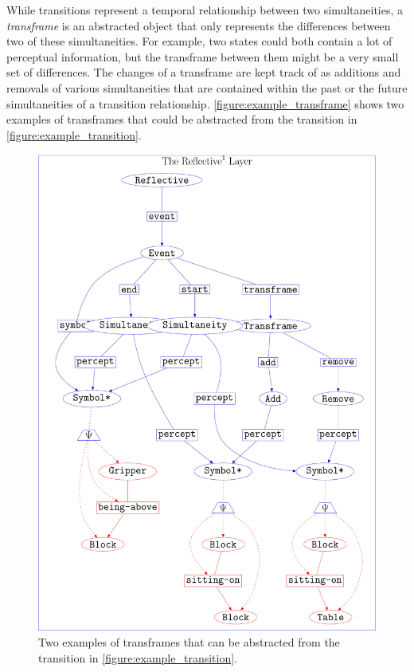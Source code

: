 While transitions represent a temporal relationship between two
simultaneities, a \emph{transframe} is an abstracted object that only
represents the differences between two of these simultaneities.  For
example, two states could both contain a lot of perceptual
information, but the transframe between them might be a very small set
of differences.  The changes of a transframe are kept track of as
additions and removals of various simultaneities that are contained
within the past or the future simultaneities of a transition
relationship.  {\mbox{\autoref{figure:example_transframe}}} shows two
examples of transframes that could be abstracted from the transition
in {\mbox{\autoref{figure:example_transition}}}.
\begin{figure}
\center
\includegraphics[width=12cm]{gfx/example_transframe}
\caption[Two examples of transframes.]{Two examples of transframes
  that can be abstracted from the transition in
  {\mbox{\autoref{figure:example_transition}}}.}
\label{figure:example_transframe}
\end{figure}

